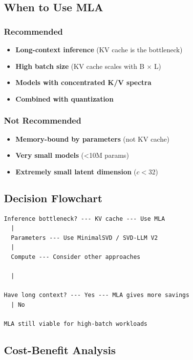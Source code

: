 \subsection{When to Use MLA}

\subsubsection{Recommended}

\begin{itemize}
\item \textbf{Long-context inference} (KV cache is the bottleneck)
\item \textbf{High batch size} (KV cache scales with B $\times$ L)
\item \textbf{Models with concentrated K/V spectra}
\item \textbf{Combined with quantization}

\end{itemize}
\subsubsection{Not Recommended}

\begin{itemize}
\item \textbf{Memory-bound by parameters} (not KV cache)
\item \textbf{Very small models} (<10M params)
\item \textbf{Extremely small latent dimension} ($c < 32$)

\end{itemize}
\subsection{Decision Flowchart}

\begin{lstlisting}
Inference bottleneck? --- KV cache --- Use MLA
  |
  Parameters --- Use MinimalSVD / SVD-LLM V2
  |
  Compute --- Consider other approaches

  |
   
Have long context? --- Yes --- MLA gives more savings
  | No
   
MLA still viable for high-batch workloads
\end{lstlisting}

\subsection{Cost-Benefit Analysis}

